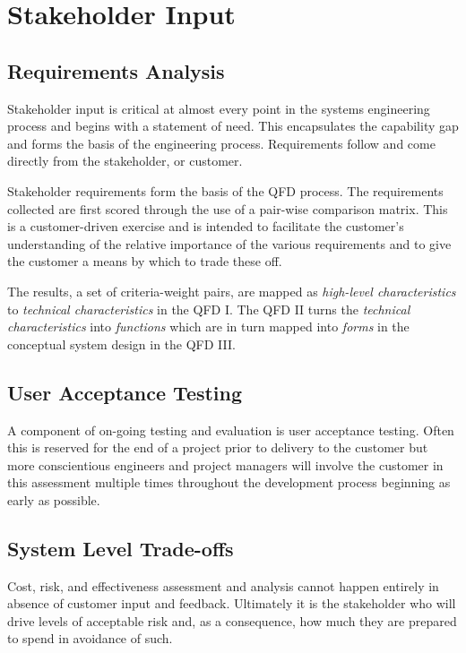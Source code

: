 \documentclass[letterpaper,12pt]{article}
\begin{document}
\section{Stakeholder Input}

\subsection{Requirements Analysis}
Stakeholder input is critical at almost every point in the systems engineering process and begins with a statement of need.  This encapsulates the capability gap and forms the basis of the engineering process.  Requirements follow and come directly from the stakeholder, or customer.

Stakeholder requirements form the basis of the QFD process.  The requirements collected are first scored through the use of a pair-wise comparison matrix.  This is a customer-driven exercise and is intended to facilitate the customer's understanding of the relative importance of the various requirements and to give the customer a means by which to trade these off.  

The results, a set of criteria-weight pairs, are mapped as \emph{high-level characteristics} to \emph{technical characteristics} in the QFD I.  The QFD II turns the \emph{technical characteristics} into \emph{functions} which are in turn mapped into \emph{forms} in the conceptual system design in the QFD III. 

\subsection{User Acceptance Testing}
A component of on-going testing and evaluation is user acceptance testing.  Often this is reserved for the end of a project prior to delivery to the customer but more conscientious engineers and project managers will involve the customer in this assessment multiple times throughout the development process beginning as early as possible.

\subsection{System Level Trade-offs}
Cost, risk, and effectiveness assessment and analysis cannot happen entirely in absence of customer input and feedback.  Ultimately it is the stakeholder who will drive levels of acceptable risk and, as a consequence, how much they are prepared to spend in avoidance of such.
\end{document}
